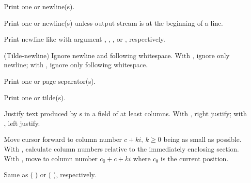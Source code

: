 \begin{LIST}{1cm}
\begin{LIST}{.5cm}
    {\index{\TLD\%}
    Print one or  newline(s).
  }

    {\index{\TLD\&}
    Print one or  newline(s) unless output stream is at the
    beginning of a line.
  }

    {\index{\TLD\_{}}
    Print newline like  with argument
    , , , or , respectively.
  }

    {
    (Tilde-newline) Ignore newline and following
    whitespace. With \kwd{:}, ignore only newline; with ,
    ignore only following whitespace.
  }

    {
    Print one or  page separator(s).
  }

    {\index{\TLD\TLD}
    Print one or  tilde(s).
  }

    {
    Justify text produced by s in a field of at least
     columns. With \kwd{:}, right justify; with ,
    left justify.
  }

    {
    Move cursor forward to column number $c + ki$, $k \geq 0$ being as small
    as possible. With \kwd{:}, calculate column numbers relative to
    the immediately enclosing section. With , move to column
    number $c_0 + c + ki$ where $c_0$ is the current position.
  }

    {
    Same as (  ) or
    (  ), respectively.
  }


\end{LIST}
\end{LIST}
